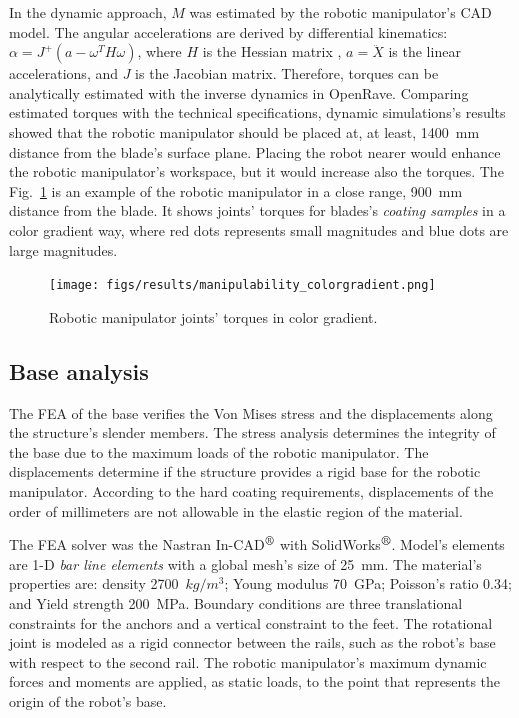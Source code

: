 In the dynamic approach, $M$ was estimated by the robotic manipulator's CAD
model. The angular accelerations are derived by differential kinematics:
$\alpha=J^+(a-\omega^TH\omega)$, where $H$ is the Hessian matrix
\cite{hourtash2005kinematic}, $a=\ddot{X}$ is the linear accelerations, and $J$
is the Jacobian matrix. Therefore, torques can be analytically estimated with
the inverse dynamics in OpenRave. Comparing estimated torques with the technical
specifications, dynamic simulations's results showed that the robotic
manipulator should be placed at, at least, 1400~mm distance from the blade's
surface plane. Placing the robot nearer would enhance the robotic manipulator's
workspace, but it would increase also the torques. The Fig.~\ref{fig:torques}
is an example of the robotic manipulator in a close range, 900~mm distance from the
blade. It shows joints' torques for blades's \textit{coating samples} in a color
gradient way, where red dots represents small magnitudes and blue dots are large magnitudes. 

\begin{figure}
	\centering
	\texttt{[image: figs/results/manipulability\_colorgradient.png]}
    \caption{Robotic manipulator joints' torques in color gradient.}
    \label{fig:torques}
\end{figure}

\subsection{Base analysis}

The FEA of the base verifies the Von Mises stress and the displacements
along the structure's slender members. The stress analysis determines the
integrity of the base due to the maximum loads of the robotic manipulator. The
displacements determine if the structure provides a rigid base for the robotic
manipulator. According to the hard coating requirements, displacements of the
order of millimeters are not allowable in the elastic region of the
material. 

The FEA solver was the Nastran In-CAD$^{\mbox{\small\textregistered}}$ with
SolidWorks$^{\mbox{\small\textregistered}}$. Model's elements are 1-D 
\textit{bar line elements} with a global mesh's size of 25~mm. The material's
properties are: density 2700~$kg/m^3$; Young modulus 70~GPa; Poisson's ratio
0.34; and Yield strength 200~MPa. Boundary conditions are three translational
constraints for the anchors and a vertical constraint to the feet. The
rotational joint is modeled as a rigid connector between the rails, such as the
robot's base with respect to the second rail. The robotic manipulator's maximum
dynamic forces and moments are applied, as static loads, to the point that
represents the origin of the robot's base.


